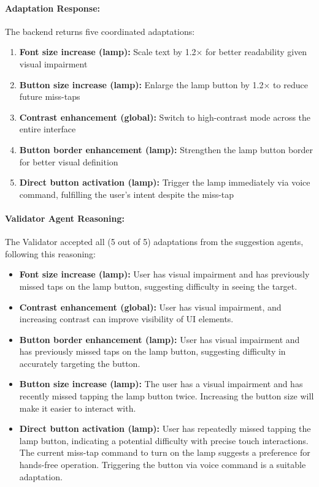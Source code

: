 \documentclass[openany]{book}
\begin{document}
\paragraph{Adaptation Response:} The backend returns five coordinated adaptations:
\begin{enumerate}
    \item \textbf{Font size increase (lamp):} Scale text by 1.2× for better readability given visual impairment
    \item \textbf{Button size increase (lamp):} Enlarge the lamp button by 1.2× to reduce future miss-taps
    \item \textbf{Contrast enhancement (global):} Switch to high-contrast mode across the entire interface
    \item \textbf{Button border enhancement (lamp):} Strengthen the lamp button border for better visual definition
    \item \textbf{Direct button activation (lamp):} Trigger the lamp immediately via voice command, fulfilling the user's intent despite the miss-tap
\end{enumerate}
\paragraph{Validator Agent Reasoning:} The Validator accepted all (5 out of 5) adaptations from the suggestion agents, following this reasoning:
\begin{itemize}
    \item \textbf{Font size increase (lamp):} User has visual impairment and has previously missed taps on the lamp button, suggesting difficulty in seeing the target.
    \item \textbf{Contrast enhancement (global):} User has visual impairment, and increasing contrast can improve visibility of UI elements.
    \item \textbf{Button border enhancement (lamp):} User has visual impairment and has previously missed taps on the lamp button, suggesting difficulty in accurately targeting the button.
    \item \textbf{Button size increase (lamp):} The user has a visual impairment and has recently missed tapping the lamp button twice. Increasing the button size will make it easier to interact with.
    \item \textbf{Direct button activation (lamp):} User has repeatedly missed tapping the lamp button, indicating a potential difficulty with precise touch interactions. The current miss-tap command to turn on the lamp suggests a preference for hands-free operation. Triggering the button via voice command is a suitable adaptation.
\end{itemize}
\end{document}

